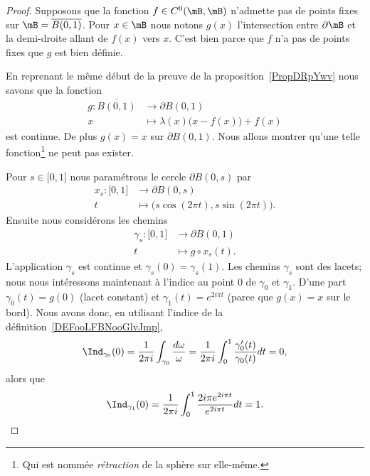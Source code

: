 \begin{proof}
	Supposons que la fonction \( f\in C^0(\mB,\mB)\) n'admette pas de points fixes sur \( \mB=\overline{ B(0,1) }\). Pour \( x\in \mB\) nous notons \( g(x)\) l'intersection entre \( \partial \mB\) et la demi-droite allant de \( f(x)\) vers \( x\). C'est bien parce que \( f\) n'a pas de points fixes que \( g\) est bien définie.

	En reprenant le même début de la preuve de la proposition~\ref{PropDRpYwv} nous savons que la fonction
	\begin{equation}
		\begin{aligned}
			g\colon \overline{ B(0,1) } & \to \partial B(0,1)                       \\
			x                           & \mapsto \lambda(x)\big( x-f(x) \big)+f(x)
		\end{aligned}
	\end{equation}
	est continue. De plus \( g(x)=x\) sur \( \partial B(0,1)\). Nous allons montrer qu'une telle fonction\footnote{Qui est nommée \emph{rétraction} de la sphère sur elle-même.} ne peut pas exister.

	Pour \( s\in\mathopen[ 0 , 1 \mathclose]\) nous paramétrons le cercle \( \partial B(0,s)\) par
	\begin{equation}
		\begin{aligned}
			x_s\colon \mathopen[ 0 , 1 \mathclose] & \to \partial B(0,s)                              \\
			t                                      & \mapsto \big( s\cos(2\pi t),s\sin(2\pi t) \big).
		\end{aligned}
	\end{equation}
	Ensuite nous considérons les chemins
	\begin{equation}
		\begin{aligned}
			\gamma_s\colon \mathopen[ 0 , 1 \mathclose] & \to \partial B(0,1)    \\
			t                                           & \mapsto g\circ x_s(t).
		\end{aligned}
	\end{equation}
	L'application \( \gamma_s\) est continue et \( \gamma_s(0)=\gamma_s(1)\). Les chemins \( \gamma_s\) sont des lacets; nous nous intéressons maintenant à l'indice au point \( 0\) de \( \gamma_0\) et \( \gamma_1\). D'une part \( \gamma_0(t)=g(0)\) (lacet constant) et \( \gamma_1(t)= e^{2i\pi t}\) (parce que \( g(x)=x\) sur le bord). Nous avons donc, en utilisant l'indice de la définition~\ref{DEFooLFBNooGlvJmp},
	\begin{equation}
		\Ind_{\gamma_0}(0)=\frac{1}{ 2\pi i }\int_{\gamma_0}\frac{ d\omega }{ \omega }=\frac{1}{ 2\pi i }\int_0^1\frac{ \gamma_0'(t) }{ \gamma_0(t) }dt=0,
	\end{equation}
	alors que
	\begin{equation}
		\Ind_{\gamma_1}(0)=\frac{1}{ 2\pi i }\int_0^1\frac{ 2i\pi e^{2i\pi t} }{  e^{2i\pi t} }dt=1.
	\end{equation}


\end{proof}
